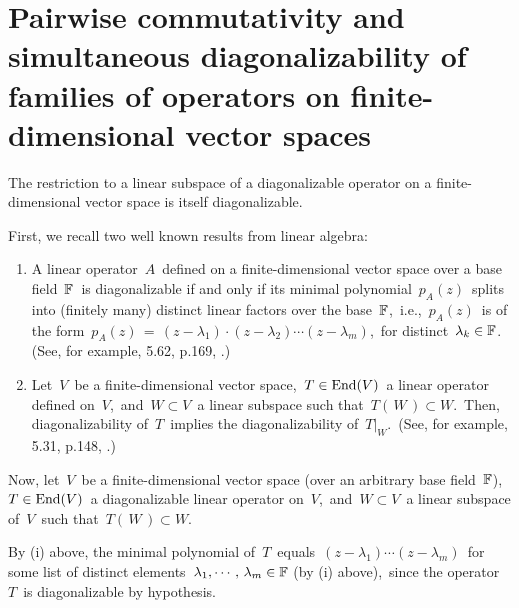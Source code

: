 
\vskip 1.0cm
\section{Pairwise commutativity and simultaneous diagonalizability of families of operators on finite-dimensional vector spaces}


\begin{proposition}
\label{RestrictionsPreserveDiagonalizability}
\mbox{}
\vskip 0.1cm
\noindent
The restriction to a linear subspace of a diagonalizable operator
on a finite-dimensional vector space is itself diagonalizable.
\end{proposition}
\proof
First, we recall two well known results from linear algebra:
\begin{enumerate}
\item 
    A linear operator \,$A$\,
    defined on a finite-dimensional vector space over a base field \,$\mathbb{F}$\,
    is diagonalizable if and only if its minimal polynomial \,$p_{A}(z)$\,
    splits into (finitely many) distinct linear factors over the base \,$\mathbb{F}$,\,
    i.e., \,$p_{A}(z)$\, is of the form
    \,$p_{A}(z) \,=\, (z - \lambda_{1}) \cdot (z - \lambda_{2}) \cdots (z - \lambda_{m})$,\,
    for distinct \,$\lambda_{k} \in \mathbb{F}$.\,
    (See, for example, 5.62, p.169, \cite{Axler2024}.)
\item
    Let \,$V$\, be a finite-dimensional vector space,
    \,$T \in \textnormal{End}(V)$\, a linear operator defined on \,$V$,\, and
    \,$W \subset V$\, a linear subspace such that \,$T(\,W\,) \subset W$.\,
    Then, diagonalizability of \,$T$\, implies the diagonalizability of \,$T\vert_{W}$.\,
    (See, for example, 5.31, p.148, \cite{Axler2024}.)
\end{enumerate}

\vskip 0.1cm
Now, let \,$V$\, be a finite-dimensional vector space (over an arbitrary base field \,$\mathbb{F}$),
\,$T \in \textnormal{End}(V)$\, a diagonalizable linear operator on \,$V$,\, and
\,$W \subset V$\, a linear subspace of \,$V$\, such that \,$T(\,W\,) \subset W$.\,

\vskip 0.1cm
By (i) above, the minimal polynomial of \,$T$\, equals
\,$(z - \lambda_{1}) \cdots (z - \lambda_{m})$\,
for some list of distinct elements
\,$\lambda_{1}, \cdots,\, \lambda_{m} \in \mathbb{F}$ (by (i) above),\,
since the operator \,$T$\, is diagonalizable by hypothesis.

